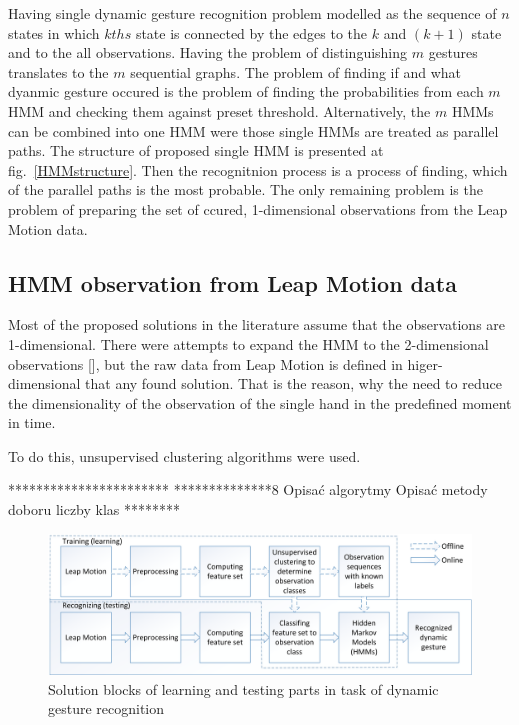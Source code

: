 Having single dynamic gesture recognition problem modelled as the sequence of $n$ states in which $kths$ state is connected by the edges to the $k$ and $(k+1)$ state and to the all observations.
Having the problem of distinguishing $m$ gestures translates to the $m$ sequential graphs.
The problem of finding if and what dyanmic gesture occured is the problem of finding the probabilities from each $m$ HMM and checking them against preset threshold.
Alternatively, the $m$ HMMs can be combined into one HMM were those single HMMs are treated as parallel paths.
The structure of proposed single HMM is presented at fig.~\ref{HMMstructure}.
Then the recognitnion process is a process of finding, which of the parallel paths is the most probable.
The only remaining problem is the problem of preparing the set of ccured, 1-dimensional observations from the Leap Motion data.

\subsection{HMM observation from Leap Motion data}

Most of the proposed solutions in the literature assume that the observations are 1-dimensional.
There were attempts to expand the HMM to the 2-dimensional observations [], but the raw data from Leap Motion is defined in higer-dimensional that any found solution.
That is the reason, why the need to reduce the dimensionality of the observation of the single hand in the predefined moment in time.

To do this, unsupervised clustering algorithms were used.

***********************
**************8
Opisać algorytmy
Opisać metody doboru liczby klas
********


\begin{figure}[htb]
\centering
 \includegraphics[width=1\columnwidth]{figures/DynamicGestures.png}
 \caption{Solution blocks of learning and testing parts in task of dynamic gesture recognition}
 \label{dynamicgesturesflow}
\end{figure}


